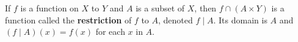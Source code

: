If $f$ is a function on $X$ to $Y$ and $A$ is a subset of $X$, then $f \cap (A \times Y)$ is a function called the \textbf{restriction} of $f$ to $A$, denoted $f \mid A$. Its domain is $A$ and $(f \mid A)(x) = f(x)$ for each $x$ in $A$.
